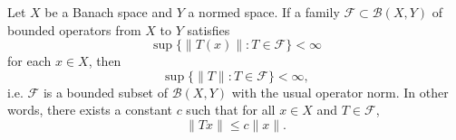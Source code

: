 \documentclass[12pt]{article}
\begin{document}
Let $X$ be a Banach space and $Y$ a normed space. 
If a family $\mathcal{F}\subset
\mathscr{B}(X,Y)$ of bounded operators from $X$ to $Y$ satisfies
$$\sup\{\|T(x)\|: T\in \mathcal{F}\}<\infty$$
for each $x\in X$, then
$$\sup\{\|T\|: T\in \mathcal{F}\}<\infty,$$
i.e. $\mathcal{F}$ is a bounded subset of $\mathscr{B}(X,Y)$ 
with the usual operator norm. In other words, 
there exists a constant $c$ such that for all $x\in X$ and $T\in \mathcal{F}$,
$$\|Tx\|\leq c\|x\|.$$
\end{document}
